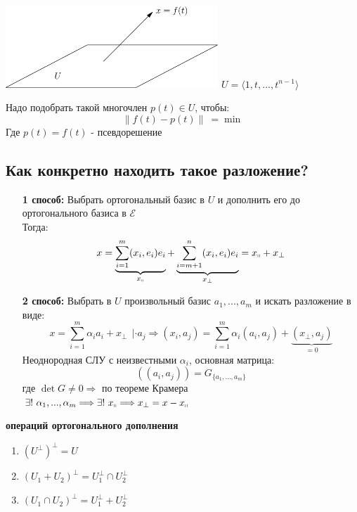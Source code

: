 \begin{example1}\tab
    \begin{center}
        \includegraphics[width=8cm]{image/Asymptote/4/linal-4-1.pdf}
        $U = \langle 1,t,...,t^{n-1} \rangle$ 
    \end{center}
    Надо подобрать такой многочлен $p(t) \in U$, чтобы: 
    $$\parallel f(t) - p(t)\parallel \ = \min$$
    Где $p(t) = f(t)$ - псевдорешение  
\end{example1}
\subsection*{Как конкретно находить такое разложение?}
\begin{itemize}
    \item[\textbf{1 способ:}] Выбрать ортогональный базис в $U$ и дополнить его до ортогонального базиса в $\mathcal{E}$\\
    Тогда:
    $$x = \underbrace{\sum \limits_{i=1}^m(x_i,e_i)e_i}_{x_\shortparallel}  + \underbrace{\sum \limits_{i=m+1}^n(x_i,e_i)e_i}_{x_\perp} = x_\shortparallel + x_\perp$$
    \item[\textbf{2 способ:}] Выбрать в $U$ произвольный базис $a_1,...,a_m$ и искать разложение в виде:
    $$x = \sum \limits_{i=1}^m \alpha_ia_i + x_\perp \ \ | \cdot a_j \Longrightarrow (x_i,a_j) = \sum \limits_{i=1}^m \alpha_i(a_i,a_j) + \underbrace{(x_\perp, a_j)}_{=0} $$
    Неоднородная СЛУ с неизвестными $\alpha_i$, основная матрица: 
    $$((a_i,a_j)) = G_{\{a_1,...,a_m\}}$$
    где $\det G \neq 0 \Longrightarrow$ по теореме Крамера $\exists ! \ \alpha_1,...,\alpha_m \Longrightarrow \exists ! \ x_\shortparallel \Longrightarrow x_\perp = x - x_\shortparallel$   
\end{itemize}
\begin{properties} \textbf{операций ортогонального дополнения} 
    \begin{enumerate}
        \item $(U^\perp)^\perp = U$
        \item $(U_1 + U_2)^\perp = U_1^\perp \cap U_2^\perp$
        \item $(U_1 \cap U_2)^\perp = U_1^\perp + U_2^\perp$
    \end{enumerate}
\end{properties}

